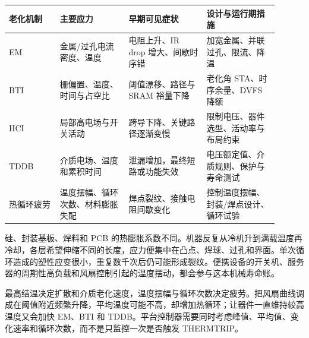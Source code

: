 \begin{longtable}{L{0.17\linewidth}L{0.23\linewidth}L{0.26\linewidth}L{0.24\linewidth}}
\toprule
老化机制 & 主要应力 & 早期可见症状 & 设计与运行期措施 \\
\midrule
EM & 金属/过孔电流密度、温度 & 电阻上升、IR drop 增大、间歇时序错 & 加宽金属、并联过孔、限流、降温 \\\tablerowrule
BTI & 栅偏置、温度、时间与占空比 & 阈值漂移、路径与 SRAM 裕量下降 & 老化角 STA、时序余量、DVFS 降额 \\\tablerowrule
HCI & 局部高电场与开关活动 & 跨导下降、关键路径逐渐变慢 & 限制电压、器件选型、活动率与布局约束 \\\tablerowrule
TDDB & 介质电场、温度和累积时间 & 泄漏增加，最终短路或功能失效 & 电压额定值、介质规则、保护与寿命测试 \\\tablerowrule
热循环疲劳 & 温度摆幅、循环次数、材料膨胀失配 & 焊点裂纹、接触电阻间歇变化 & 控制温度摆幅、封装/焊点设计、循环试验 \\
\bottomrule
\end{longtable}


硅、封装基板、焊料和 PCB 的热膨胀系数不同。机器反复从冷机升到满载温度再冷却，各层希望伸缩不同的长度，应力便集中在凸点、焊球、过孔和界面。单次循环造成的塑性应变很小，重复数千次后仍可能形成裂纹。便携设备的开关机、服务器的周期性高负载和风扇控制引起的温度摆动，都会参与这本机械寿命账。

最高结温决定扩散和介质老化速度，温度摆幅与循环次数决定疲劳。把风扇曲线调成在阈值附近频繁升降，平均温度可能不高，却增加热循环；让器件一直维持较高温度又会加快 EM、BTI 和 TDDB。平台控制器需要同时考虑峰值、平均值、变化速率和循环次数，而不是只监控一次是否触发 THERMTRIP。

